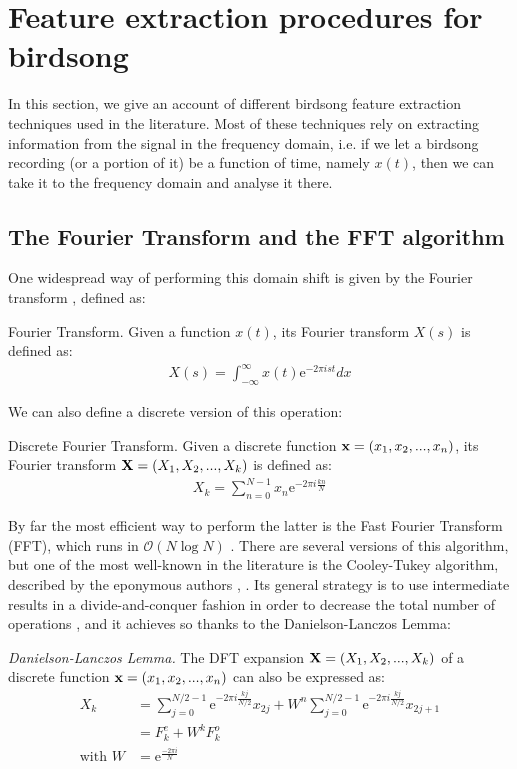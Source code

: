 \documentclass[../main.tex]{subfiles} \label{chapter_soa}
\begin{document}
\section{Feature extraction procedures for birdsong} \label{features_review}
In this section, we give an account of different birdsong feature extraction techniques used in the literature. Most of these techniques rely on extracting information from the signal in the frequency domain, i.e. if we let a birdsong recording (or a portion of it) be a function of time, namely $x(t)$, then we can take it to the frequency domain and analyse it there. 
\subsection{The Fourier Transform and the FFT algorithm} \label{subsection_fft}
\par One widespread way of performing this domain shift is given by the Fourier transform \cite{Weisstein2015}, defined as:
\theoremstyle{definition}
\begin{definition}{Fourier Transform}.
Given a function $x(t)$, its Fourier transform $X(s)$ is defined as:
\begin{align*}
X(s) = \int_{-\infty}^{\infty}x(t)\mathrm{e}^{-2\pi ist}dx
\end{align*}
\end{definition}
\par We can also define a discrete version of this operation:
\begin{definition}{Discrete Fourier Transform}.
Given a discrete function $\mathbf{x} = (x_1,x_2,...,x_n)$, its Fourier transform $\mathbf{X} = (X_1, X_2,...,X_k)$ is defined as:
\begin{align*}
X_k = \sum_{n=0}^{N-1}x_n\mathrm{e}^{-2\pi i\frac{kn}{N}}
\end{align*}
\end{definition}
\par By far the most efficient way to perform the latter is the Fast Fourier Transform (FFT), which runs in $\mathcal{O}(N\log{N})$ \cite{Smith2011}. There are several versions of this algorithm, but one of the most well-known in the literature is the Cooley-Tukey algorithm, described by the eponymous authors \cite{Cooley1965}, \cite{Weisstein2015}. Its general strategy is to use intermediate results in a divide-and-conquer fashion in order to decrease the total number of operations \cite{Weisstein2015}, and it achieves so thanks to the Danielson-Lanczos Lemma:
\begin{lemma}
\emph{Danielson-Lanczos Lemma.} The DFT expansion $\mathbf{X} = (X_1, X_2,...,X_k)$ of a discrete function $\mathbf{x} = (x_1,x_2,...,x_n)$ can also be expressed as:\\
\begin{align*}
X_k &= \sum_{j=0}^{N/2-1}\mathrm{e}^{-2\pi i\frac{kj}{N/2}}x_{2j} + W^n\sum_{j=0}^{N/2-1}\mathrm{e}^{-2\pi i\frac{kj}{N/2}}x_{2j+1}\\
&=F^e_k + W^kF^o_k \\
\text{with } W &= \mathrm{e}^ {\frac{-2\pi i}{N} }
\end{align*}
\end{lemma}
\end{document}

